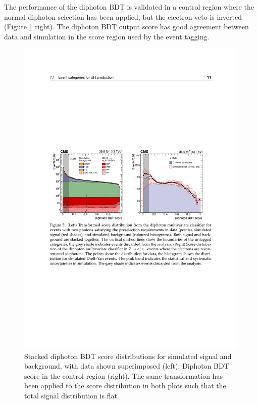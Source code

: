 The performance of the diphoton BDT is validated in a \Zee control region where the normal diphoton selection has been applied, but the electron veto is inverted (Figure \ref{fig:event_categorisaton:diphoton_bdt} right). The diphoton BDT output score has good agreement between data and simulation in the score region used by the event tagging.
\begin{figure}[h!]
    \centering
        \includegraphics[width=0.99\textwidth]{figures/event_selection/diphoton_BDT.pdf}
    \caption{Stacked diphoton BDT score distributions for simulated signal and background, with data shown superimposed (left). Diphoton BDT score in the \Zee control region (right). 
             The same transformation has been applied to the score distribution in both plots such that the total signal distribution is flat.}
        \label{fig:event_categorisaton:diphoton_bdt}
\end{figure}


